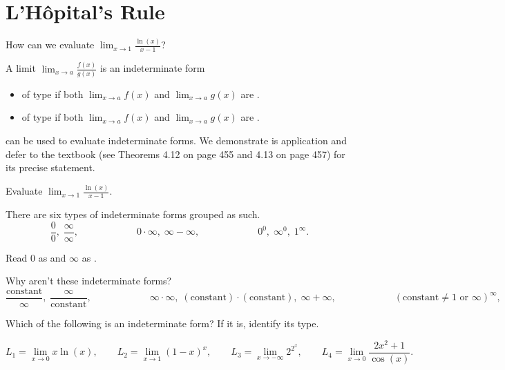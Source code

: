 \documentclass[../main.tex]{subfiles}
\begin{document}
 \section{L'H\^opital's Rule}
  How can we evaluate \(\lim_{x \to 1} \frac{\ln(x)}{x - 1}\)?

  A limit \(\lim_{x \to a} \frac{f(x)}{g(x)}\) is an indeterminate form 
  \begin{itemize}
    \item of type \underline{\hspace{1in}} if both \(\lim_{x \to a} f(x)\) and \(\lim_{x \to a} g(x)\) are \underline{\hspace{1in}}.
    \item of type \underline{\hspace{1in}} if both \(\lim_{x \to a} f(x)\) and \(\lim_{x \to a} g(x)\) are \underline{\hspace{1in}}.
  \end{itemize}
   can be used to evaluate indeterminate forms. We demonstrate is application and defer to the textbook (see Theorems 4.12 on page 455 and 4.13 on page 457) for its precise statement.
  
  \begin{example}
    Evaluate \(\lim_{x \to 1} \frac{\ln(x)}{x - 1}\).
  \end{example}

  There are six types of indeterminate forms grouped as such.
  \[
    \frac{0}{0},\; \frac{\infty}{\infty}, \hspace{1in} 0 \cdot \infty,\; \infty - \infty, \hspace{1in} 0^{0}, \; \infty^{0}, \; 1^{\infty}.
  \]

  Read \(0\) as \underline{\hspace{3in}} and \(\infty\) as \underline{\hspace{3in}}. 

  Why aren't these indeterminate forms?
  \[
    \frac{\text{constant}}{\infty},\; \frac{\infty}{\text{constant}}, \hspace{1in} \infty \cdot \infty,\; (\text{constant}) \cdot (\text{constant}),\; \infty + \infty, \hspace{1in} (\text{constant} \ne 1 \text{ or } \infty)^{\infty}, 
  \]
  
  \begin{example}
    Which of the following is an indeterminate form? If it is, identify its type. 

    \[
      L_{1} = \lim_{x \to 0} x \ln(x),
      \qquad
      L_{2} = \lim_{x \to 1} (1-x)^{x},
      \qquad
      L_{3} = \lim_{x \to -\infty} 2^{2^{x}},
      \qquad
      L_{4} = \lim_{x \to 0} \frac{2x^{2}+1}{\cos(x)}.
    \]
  \end{example}
\end{document}
